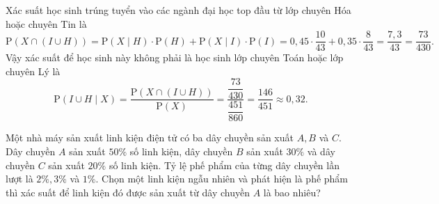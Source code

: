 \begin{bt}
{		Xác suất học sinh trúng tuyển vào các  ngành đại học top đầu từ lớp chuyên Hóa hoặc chuyên Tin là $$\mathrm{P}\left(X\cap(I\cup H)\right)=\mathrm{P}\left(X\mid H\right)\cdot\mathrm{P}\left(H\right)+\mathrm{P}\left(X\mid I\right)\cdot\mathrm{P}\left(I\right)=0{,}45\cdot\dfrac{10}{43}+0{,}35\cdot\dfrac{8}{43}=\dfrac{7{,}3}{43}=\dfrac{73}{430}.$$
		Vậy xác suất để học sinh này không phải là học sinh lớp chuyên  Toán hoặc lớp chuyên Lý là $$\mathrm{P}\left(I\cup H\mid X\right)=\dfrac{\mathrm{P}\left(X\cap(I\cup H)\right)}{\mathrm{P}\left(X\right)}=\dfrac{\dfrac{73}{430}}{\dfrac{451}{860}}=\dfrac{146}{451}\approx 0{,}32.$$
	} 
\end{bt}

\begin{bt}%
	Một nhà máy sản xuất linh kiện điện tử có ba dây chuyền sản xuất $A, B$ và $C$. Dây chuyền $A$ sản xuất $50\%$ số linh kiện, dây chuyền $B$ sản xuất $30\%$ và dây chuyền $C$ sản xuất $20\%$ số linh kiện. Tỷ lệ phế phẩm của từng dây chuyền lần lượt là $2\%, 3\%$ và $1\%$. Chọn một linh kiện ngẫu nhiên và phát hiện là phế phẩm thì xác suất để linh kiện đó được sản xuất từ dây chuyền $A$ là bao nhiêu? 
\end{bt}
